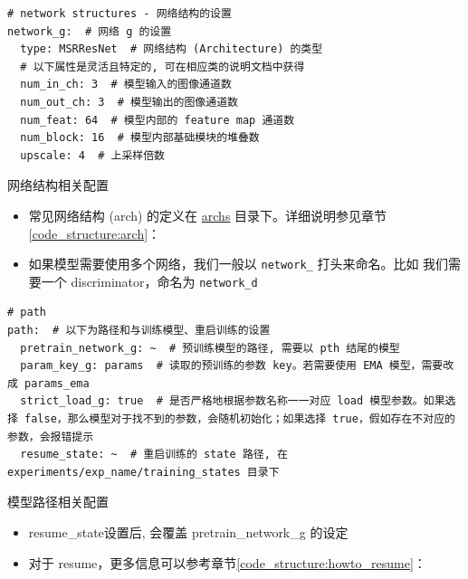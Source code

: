 \documentclass[../main.tex]{subfiles}
\begin{document}
\begin{verbatim}
# network structures - 网络结构的设置
network_g:  # 网络 g 的设置
  type: MSRResNet  # 网络结构 (Architecture) 的类型
  # 以下属性是灵活且特定的, 可在相应类的说明文档中获得
  num_in_ch: 3  # 模型输入的图像通道数
  num_out_ch: 3  # 模型输出的图像通道数
  num_feat: 64  # 模型内部的 feature map 通道数
  num_block: 16  # 模型内部基础模块的堆叠数
  upscale: 4  # 上采样倍数
\end{verbatim}

\begin{exampleBox}[righthand ratio=0.00, sidebyside, sidebyside align=center, lower separated=false]{网络结构相关配置}
    \begin{itemize}
        \item 常见网络结构 (arch) 的定义在 \href{https://github.com/XPixelGroup/BasicSR/tree/master/basicsr/archs}{archs} 目录下。详细说明参见章节\ref{code_structure:arch}：
        \item 如果模型需要使用多个网络，我们一般以 \texttt{network\_} 打头来命名。比如 我们需要一个 discriminator，命名为  \texttt{network\_d}
    \end{itemize}
\end{exampleBox}

\begin{verbatim}
# path
path:  # 以下为路径和与训练模型、重启训练的设置
  pretrain_network_g: ~  # 预训练模型的路径, 需要以 pth 结尾的模型
  param_key_g: params  # 读取的预训练的参数 key。若需要使用 EMA 模型，需要改成 params_ema
  strict_load_g: true  # 是否严格地根据参数名称一一对应 load 模型参数。如果选择 false，那么模型对于找不到的参数，会随机初始化；如果选择 true，假如存在不对应的参数，会报错提示
  resume_state: ~  # 重启训练的 state 路径, 在 experiments/exp_name/training_states 目录下
\end{verbatim}

\begin{exampleBox}[righthand ratio=0.00, sidebyside, sidebyside align=center, lower separated=false]{模型路径相关配置}
    \begin{itemize}
        \item resume\_state设置后, 会覆盖 pretrain\_network\_g 的设定
        \item 对于 resume，更多信息可以参考章节\ref{code_structure:howto_resume}：
    \end{itemize}
\end{exampleBox}
\end{document}
